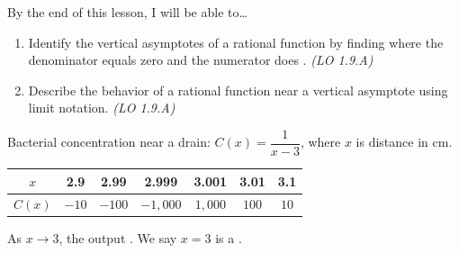 \documentclass[10pt]{article}
\begin{document}
\namedateperiod

\vspace{0.1in}

\begin{objectivebox}
By the end of this lesson, I will be able to\ldots
\begin{enumerate}[itemsep=2pt]
  \item Identify the vertical asymptotes of a rational function by finding where the denominator
        equals zero and the numerator does . \hfill\textit{(LO 1.9.A)}
  \item Describe the behavior of a rational function near a vertical asymptote using
         limit notation. \hfill\textit{(LO 1.9.A)}
\end{enumerate}
\end{objectivebox}

\vspace{0.1in}

\begin{vocabbox}
\end{vocabbox}

\vspace{0.1in}

\begin{hookbox}
Bacterial concentration near a drain: $C(x) = \dfrac{1}{x - 3}$, where $x$ is distance in cm.

\smallskip
\renewcommand{\arraystretch}{1.3}
\begin{tabular}{|c|c|c|c|c|c|c|}
\hline
$x$    & 2.9 & 2.99 & 2.999 & 3.001 & 3.01 & 3.1 \\
\hline
$C(x)$ & $-10$ & $-100$ & $-1{,}000$ & $1{,}000$ & $100$ & $10$ \\
\hline
\end{tabular}
\smallskip

As $x \to 3$, the output .
We say $x = 3$ is a .
\end{hookbox}

\vspace{0.1in}
\end{document}
